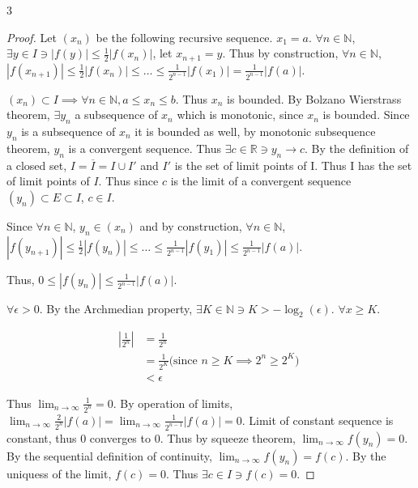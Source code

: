 \documentclass{article}
\newcommand{\R}{\mathbb{R}}
\newcommand{\N}{\mathbb{N}}
\newcommand{\abs}[1]{\left\lvert #1\right\rvert}
\begin{document}
\begin{PROB}{3}\label{Problem 3.}
\end{PROB}
\begin{proof}
    Let $(x_n)$ be the following recursive sequence. $x_1 = a$. $\forall n \in \N$, $\exists y \in I \ni \abs{f(y)} \leq \frac{1}{2}\abs{f(x_n)}$, let $x_{n + 1} = y$. Thus by construction, $\forall n \in \N$, $\abs{f(x_{n + 1})} \leq \frac{1}{2}\abs{f(x_n)} \leq \dots \leq \frac{1}{2^{n - 1}}\abs{f(x_1)} = \frac{1}{2^{n - 1}} \abs{f(a)}$.   

    $(x_n) \subset I \implies \forall n \in \N, a \leq x_n \leq b$. Thus $x_n$ is bounded. By Bolzano Wierstrass theorem, $\exists y_n$ a subsequence of $x_n$ which is monotonic, since $x_n$ is bounded. Since $y_n$ is a subsequence of $x_n$ it is bounded as well, by monotonic subsequence theorem, $y_n$ is a convergent sequence. Thus $\exists c \in \R \ni y_n \to c$. By the definition of a closed set, $I = \overline{I} = I \cup I'$ and $I'$ is the set of limit points of I. Thus I has the set of limit points of $I$. Thus since $c$ is the limit of a convergent sequence $(y_n) \subset E\subset I$, $c \in I$.
    
    Since $\forall n \in \N$, $y_n \in (x_n)$ and by construction, $\forall n \in \N$, $\abs{f(y_{n + 1})} \leq \frac{1}{2}\abs{f(y_n)} \leq \dots \leq \frac{1}{2^{n - 1}}\abs{f(y_1)} \leq \frac{1}{2^{n - 1}} \abs{f(a)}$.
    
    Thus, $0 \leq \abs{f(y_n)} \leq \frac{1}{2^{n - 1}}\abs{f(a)}$. 
    
    $\forall \epsilon > 0$. By the Archmedian property, $\exists K \in \N \ni K > -\log_2(\epsilon)$. $\forall x \geq K$.   
    
    \begin{align*}
        \abs{\frac{1}{2^n}} &= \frac{1}{2^n} \\
        &= \frac{1}{2^K} \text{(since $n \geq K \implies 2^n \geq 2^K$) }\\
        &< \epsilon 
    \end{align*}

    Thus $\lim_{n \to \infty} \frac{1}{2^n} = 0$. By operation of limits, $\lim_{n \to \infty} \frac{2}{2^{n}} \abs{f(a)} = \lim_{n \to \infty} \frac{1}{2^{n - 1}} \abs{f(a)} = 0$. Limit of constant sequence is constant, thus 0 converges to 0. Thus by squeeze theorem, $\lim_{n \to \infty} f(y_n) = 0$. By the sequential definition of continuity, $\lim_{n \to \infty} f(y_n) = f(c)$. By the uniquess of the limit, $f(c) = 0$. Thus $\exists c \in I \ni f(c) = 0.$      
\end{proof}
\end{document}
